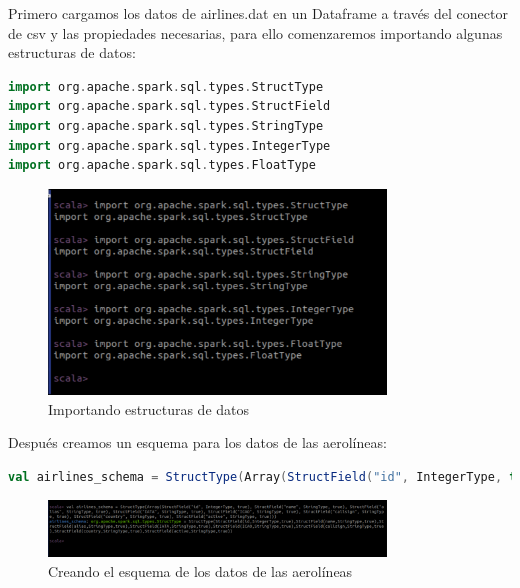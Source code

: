 Primero cargamos los datos de airlines.dat en un Dataframe a través del conector de csv y las propiedades necesarias, para ello comenzaremos importando algunas estructuras de datos:

\begin{lstlisting}[language=scala]
import org.apache.spark.sql.types.StructType
import org.apache.spark.sql.types.StructField
import org.apache.spark.sql.types.StringType
import org.apache.spark.sql.types.IntegerType
import org.apache.spark.sql.types.FloatType
\end{lstlisting}

\begin{figure}[H]
    \centering
    \includegraphics[width=0.8\textwidth]{figures/33.png}
    \caption{Importando estructuras de datos}
    \label{fig:import_data_structures}
\end{figure}

Después creamos un esquema para los datos de las aerolíneas:

\begin{lstlisting}[language=scala]
val airlines_schema = StructType(Array(StructField("id", IntegerType, true), StructField("name", StringType, true), StructField("alias", StringType,true), StructField("IATA", StringType, true),StructField("ICAO", StringType, true),StructField("callsign", StringType, true), StructField("country", StringType, true), StructField("active", StringType, true)))
\end{lstlisting}

\begin{figure}[H]
    \centering
    \includegraphics[width=0.8\textwidth]{figures/34.png}
    \caption{Creando el esquema de los datos de las aerolíneas}
    \label{fig:create_airlines_schema}
\end{figure}

